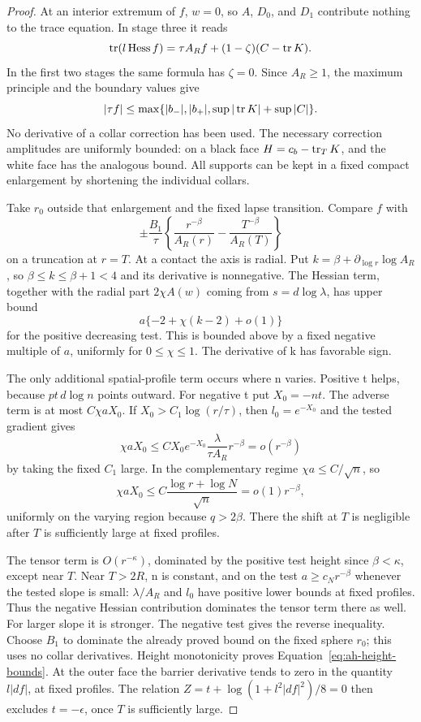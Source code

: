 \begin{proof}
At an interior extremum of \(f\), \(w=0\), so \(A\), \(D_0\), and
\(D_1\) contribute nothing to the trace equation.  In stage three
it reads
\[
 \operatorname{tr}(l\operatorname{Hess} f)=\tau A_Rf+(1-\zeta)(C-\operatorname{tr} K).
\]
In the first two stages the same formula has \(\zeta=0\).
Since \(A_R\ge1\), the maximum principle and the boundary values
give
\[
 |\tau f|\le
 \max\{|b_-|,|b_+|,\sup|\operatorname{tr} K|+\sup|C|\}.
\]
No derivative of a collar correction has been used.  The necessary
correction amplitudes are uniformly bounded: on a black face
\(H=c_b-\operatorname{tr}_TK\), and the white face has the analogous bound.
All supports can be kept in a fixed compact enlargement by
shortening the individual collars.

Take \(r_0\) outside that enlargement and the fixed lapse transition.
Compare \(f\) with
\[
 \pm\frac{B_1}{\tau}
 \left\{\frac{r^{-\beta}}{A_R(r)}
       -\frac{T^{-\beta}}{A_R(T)}\right\}
\]
on a truncation at \(r=T\).  At a contact the axis is radial.
Put \(k=\beta+\partial_{\log r}\log A_R\), so
\(\beta\le k\le\beta+1<4\) and its derivative is nonnegative.
The Hessian term, together with the radial part \(2\chi A(w)\)
coming from \(s=d\log\lambda\), has upper bound
\[
 a\{-2+\chi(k-2)+o(1)\}
\]
for the positive decreasing test.  This is bounded above by a
fixed negative multiple of \(a\), uniformly for \(0\le\chi\le1\).
The derivative of k has favorable sign.

The only additional spatial-profile term occurs where n varies.
Positive t helps, because \(pt\,d\log n\) points outward.
For negative t put \(X_0=-nt\).  The adverse term is at most
\(C\chi aX_0\).  If
\(X_0>C_1\log(r/\tau)\), then \(l_0=e^{-X_0}\) and the tested
gradient gives
\[
 \chi aX_0\le
 C X_0e^{-X_0}\frac{\lambda}{\tau A_R}r^{-\beta}
 =o(r^{-\beta})
\]
by taking the fixed \(C_1\) large.  In the complementary regime
\(\chi a\le C/\sqrt n\), so
\[
 \chi aX_0\le
 C\frac{\log r+\log N}{\sqrt n}=o(1)r^{-\beta},
\]
uniformly on the varying region because \(q>2\beta\).
There the shift at \(T\) is negligible after \(T\) is sufficiently
large at fixed profiles.

The tensor term is \(O(r^{-\kappa})\), dominated by the positive
test height since \(\beta<\kappa\), except near \(T\).
Near \(T>2R\), n is constant, and on the test
\(a\ge c_Nr^{-\beta}\) whenever the tested slope is small:
\(\lambda/A_R\) and \(l_0\) have positive lower bounds at fixed
profiles.  Thus the negative Hessian contribution dominates the
tensor term there as well.  For larger slope it is stronger.
The negative test gives the reverse inequality.  Choose \(B_1\)
to dominate the already proved bound on the fixed sphere \(r_0\);
this uses no collar derivatives.  Height monotonicity proves
Equation~\eqref{eq:ah-height-bounds}.  At the outer face the barrier
derivative tends to zero in the quantity \(l|df|\), at fixed
profiles.  The relation \(Z=t+\log(1+l^2|df|^2)/8=0\) then excludes
\(t=-\epsilon\), once \(T\) is sufficiently large.


\end{proof}
